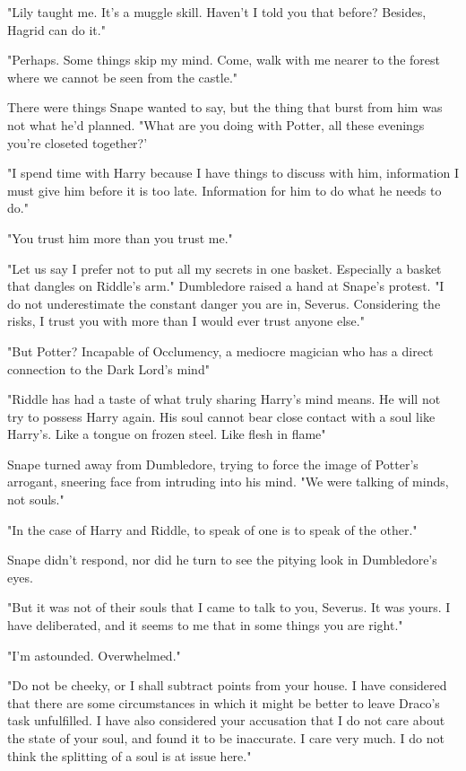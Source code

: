 "Lily taught me. It's a muggle skill. Haven't I told you that before? Besides, Hagrid can do it."

"Perhaps. Some things skip my mind. Come, walk with me nearer to the forest where we cannot be seen from the castle."

There were things Snape wanted to say, but the thing that burst from him was not what he'd planned. "What are you doing with Potter, all these evenings you're closeted together?'

"I spend time with Harry because I have things to discuss with him, information I must give him before it is too late. Information for him to do what he needs to do."

"You trust him more than you trust me."

"Let us say I prefer not to put all my secrets in one basket. Especially a basket that dangles on Riddle's arm." Dumbledore raised a hand at Snape's protest. "I do not underestimate the constant danger you are in, Severus. Considering the risks, I trust you with more than I would ever trust anyone else."

"But Potter? Incapable of Occlumency, a mediocre magician who has a direct connection to the Dark Lord's mind{\el}"

"Riddle has had a taste of what truly sharing Harry's mind means. He will not try to possess Harry again. His soul cannot bear close contact with a soul like Harry's. Like a tongue on frozen steel. Like flesh in flame{\el}"

Snape turned away from Dumbledore, trying to force the image of Potter's arrogant, sneering face from intruding into his mind. "We were talking of minds, not souls."

"In the case of Harry and Riddle, to speak of one is to speak of the other."

Snape didn't respond, nor did he turn to see the pitying look in Dumbledore's eyes.

"But it was not of their souls that I came to talk to you, Severus. It was yours. I have deliberated, and it seems to me that in some things you are right."

"I'm astounded. Overwhelmed."

"Do not be cheeky, or I shall subtract points from your house. I have considered that there are some circumstances in which it might be better to leave Draco's task unfulfilled. I have also considered your accusation that I do not care about the state of your soul, and found it to be inaccurate. I care very much. I do not think the splitting of a soul is at issue here."

